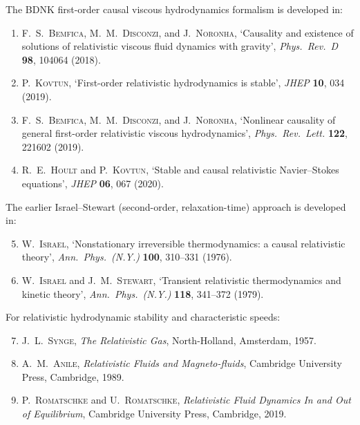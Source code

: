 The BDNK first-order causal viscous hydrodynamics formalism is
developed in:

\begin{enumerate}
\item\label{BemficaDN2018} F.~S.~\textsc{Bemfica},
  M.~M.~\textsc{Disconzi}, and J.~\textsc{Noronha}, `Causality and
  existence of solutions of relativistic viscous fluid dynamics with
  gravity', \emph{Phys.\ Rev.\ D} \textbf{98}, 104064 (2018).

\item\label{Kovtun2019} P.~\textsc{Kovtun}, `First-order relativistic
  hydrodynamics is stable', \emph{JHEP} \textbf{10}, 034 (2019).

\item F.~S.~\textsc{Bemfica}, M.~M.~\textsc{Disconzi}, and
  J.~\textsc{Noronha}, `Nonlinear causality of general first-order
  relativistic viscous hydrodynamics', \emph{Phys.\ Rev.\ Lett.}
  \textbf{122}, 221602 (2019).

\item R.~E.~\textsc{Hoult} and P.~\textsc{Kovtun}, `Stable and causal
  relativistic Navier--Stokes equations', \emph{JHEP} \textbf{06},
  067 (2020).
\end{enumerate}

\noindent
The earlier Israel--Stewart (second-order, relaxation-time) approach
is developed in:

\begin{enumerate}\setcounter{enumi}{4}
\item W.~\textsc{Israel}, `Nonstationary irreversible thermodynamics:
  a causal relativistic theory', \emph{Ann.\ Phys.\ (N.Y.)}
  \textbf{100}, 310--331 (1976).

\item W.~\textsc{Israel} and J.~M.~\textsc{Stewart}, `Transient
  relativistic thermodynamics and kinetic theory',
  \emph{Ann.\ Phys.\ (N.Y.)} \textbf{118}, 341--372 (1979).
\end{enumerate}

\noindent
For relativistic hydrodynamic stability and characteristic speeds:

\begin{enumerate}\setcounter{enumi}{6}
\item J.~L.~\textsc{Synge}, \emph{The Relativistic Gas}, North-Holland,
  Amsterdam, 1957.

\item A.~M.~\textsc{Anile}, \emph{Relativistic Fluids and
  Magneto-fluids}, Cambridge University Press, Cambridge, 1989.

\item P.~\textsc{Romatschke} and U.~\textsc{Romatschke},
  \emph{Relativistic Fluid Dynamics In and Out of Equilibrium},
  Cambridge University Press, Cambridge, 2019.
\end{enumerate}


